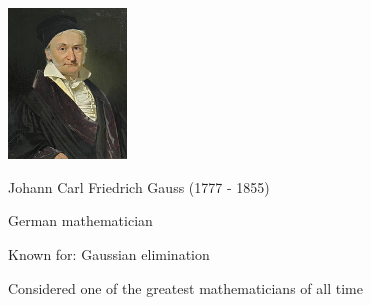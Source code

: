 \begin{frame}
\hfil\hfil \includegraphics[height=4cm]{../../modules/history/pictures/gauss.jpg}

\hfil\hfil Johann Carl Friedrich Gauss (1777 - 1855)

\hfil\hfil German mathematician

\hfil\hfil Known for: Gaussian elimination

\hfil\hfil Considered one of the greatest mathematicians of all time


\end{frame}